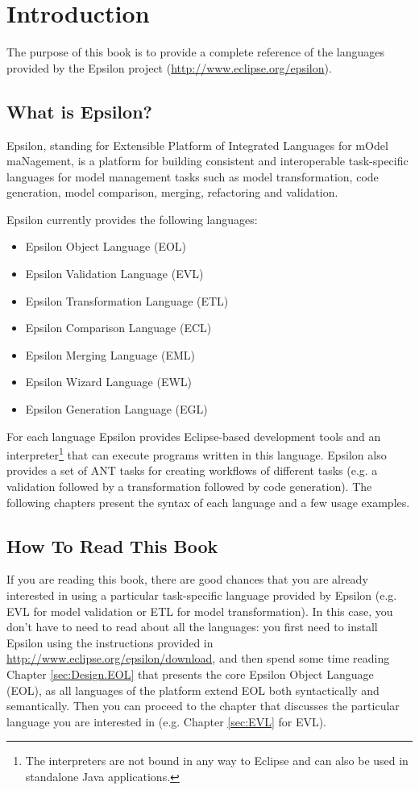 \chapter{Introduction}
\label{chp:Introduction}

The purpose of this book is to provide a complete reference of the languages provided by the Epsilon project (\url{http://www.eclipse.org/epsilon}).

\section{What is Epsilon?}

Epsilon, standing for Extensible Platform of Integrated Languages for mOdel maNagement, is a platform for building consistent and interoperable task-specific languages for model management tasks such as model transformation, code generation, model comparison, merging, refactoring and validation.

Epsilon currently provides the following languages:

\begin{itemize}
	\item Epsilon Object Language (EOL)
	\item Epsilon Validation Language (EVL)
	\item Epsilon Transformation Language (ETL)
	\item Epsilon Comparison Language (ECL)
	\item Epsilon Merging Language (EML)
	\item Epsilon Wizard Language (EWL)
	\item Epsilon Generation Language (EGL)
\end{itemize}

For each language Epsilon provides Eclipse-based development tools and an interpreter\footnote{The interpreters are not bound in any way to Eclipse and can also be used in standalone Java applications.} that can execute programs written in this language. Epsilon also provides a set of ANT tasks for creating workflows of different tasks (e.g. a validation followed by a transformation followed by code generation). The following chapters present the syntax of each language and a few usage examples.

\section{How To Read This Book}

If you are reading this book, there are good chances that you are already interested in using a particular task-specific language provided by Epsilon (e.g. EVL for model validation or ETL for model transformation). In this case, you don't have to need to read about all the languages: you first need to install Epsilon using the instructions provided in \url{http://www.eclipse.org/epsilon/download}, and then spend some time reading Chapter \ref{sec:Design.EOL} that presents the core Epsilon Object Language (EOL), as all languages of the platform extend EOL both syntactically and semantically. Then you can proceed to the chapter that discusses the particular language you are interested in (e.g. Chapter \ref{sec:EVL} for EVL).


